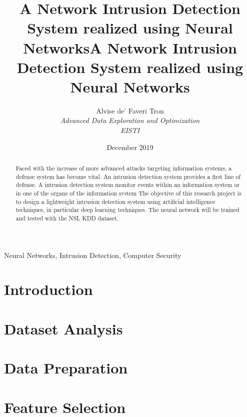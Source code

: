 \documentclass[conference]{IEEEtran}
\title{A Network Intrusion Detection System realized using Neural Networks}
\author{Alvise de' Faveri Tron\\
\textit{Advanced Data Exploration and Optimization}\\
\textit{EISTI}}
\date{December 2019}
\begin{document}
\title{A Network Intrusion Detection System realized using Neural Networks\\
}

\author{
}

\maketitle

\begin{abstract}

Faced with the increase of more advanced attacks targeting information systems, a defense system has become vital. An intrusion detection system provides a first line of defense. 
A intrusion detection system monitor events within an information system or in one of the organs of the information system
The objective of this research project is to design a lightweight intrusion detection system using artificial intelligence techniques, in particular deep learning techniques. 
The neural network will be trained and tested with the NSL KDD dataset.
\end{abstract}

\begin{IEEEkeywords}
Neural Networks, Intrusion Detection, Computer Security
\end{IEEEkeywords}

\section{Introduction}
\label{chapter:introduction}


\section{Dataset Analysis}
\label{chapter:dataset}


\section{Data Preparation}
\label{chapter:dat-preparation}


\section{Feature Selection}
\label{chapter:feature-selection}

\end{document}
